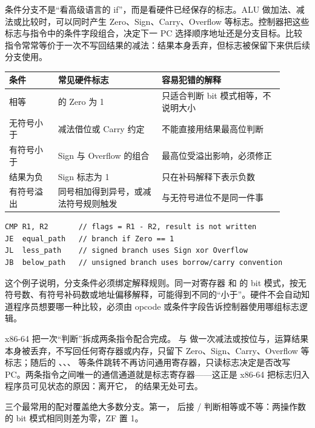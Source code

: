 条件分支不是“看高级语言的 if”，而是看硬件已经保存的标志。ALU 做加法、减法或比较时，可以同时产生 Zero、Sign、Carry、Overflow 等标志。控制器把这些标志与指令中的条件字段组合，决定下一 PC 选择顺序地址还是分支目标。比较指令常常等价于一次不写回结果的减法：结果本身丢弃，但标志被保留下来供后续分支使用。

\begin{longtable}{L{0.16\linewidth}L{0.34\linewidth}L{0.4\linewidth}}
\toprule
条件 & 常见硬件标志 & 容易犯错的解释 \\
\midrule
相等 &  的 Zero 为 1 & 只适合判断 bit 模式相等，不说明大小 \\\tablerowrule
无符号小于 & 减法借位或 Carry 约定 & 不能直接用结果最高位判断 \\\tablerowrule
有符号小于 & Sign 与 Overflow 的组合 & 最高位受溢出影响，必须修正 \\\tablerowrule
结果为负 & Sign 标志为 1 & 只在补码解释下表示负数 \\\tablerowrule
有符号溢出 & 同号相加得到异号，或减法符号规则触发 & 与无符号进位不是同一件事 \\
\bottomrule
\end{longtable}

\begin{lstlisting}
CMP R1, R2       // flags = R1 - R2, result is not written
JE  equal_path   // branch if Zero == 1
JL  less_path    // signed branch uses Sign xor Overflow
JB  below_path   // unsigned branch uses borrow/carry convention
\end{lstlisting}

这个例子说明，分支条件必须绑定解释规则。同一对寄存器  和  的 bit 模式，按无符号数、有符号补码数或地址偏移解释，可能得到不同的“小于”。硬件不会自动知道程序员想要哪一种比较，必须由 opcode 或条件字段告诉控制器使用哪组标志逻辑。

x86-64 把一次“判断”拆成两条指令配合完成。 与  做一次减法或按位与，运算结果本身被丢弃，不写回任何寄存器或内存，只留下 Zero、Sign、Carry、Overflow 等标志；随后的 、、、 等条件跳转不再访问通用寄存器，只读标志决定是否改写 PC。两条指令之间唯一的通信通道就是标志寄存器——这正是 x86-64 把标志归入程序员可见状态的原因：离开它， 的结果无处可去。

三个最常用的配对覆盖绝大多数分支。第一， 后接 / 判断相等或不等：两操作数的 bit 模式相同则差为零，ZF 置 1。

